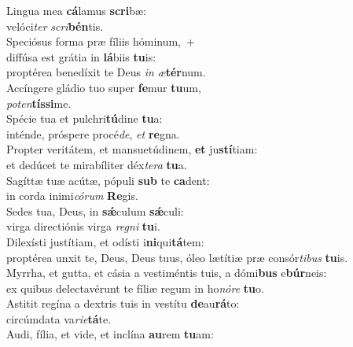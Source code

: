 \evenverse Lingua mea \textbf{cá}lamus \textbf{scri}bæ:~\*\\
\evenverse velóci\textit{ter} \textit{scri}\textbf{bén}tis.\\
\oddverse Speciósus forma præ fíliis hóminum,~+\\
\oddverse  diffúsa est grátia in \textbf{lá}biis \textbf{tu}is:~\*\\
\oddverse proptérea benedíxit te Deus \textit{in} \textit{æ}\textbf{tér}num.\\
\evenverse Accíngere gládio tuo super \textbf{fe}mur \textbf{tu}um,~\*\\
\evenverse \textit{po}\textit{ten}\textbf{tís}\textbf{si}me.\\
\oddverse Spécie tua et pulchri\textbf{tú}dine \textbf{tu}a:~\*\\
\oddverse inténde, próspere procé\textit{de}, \textit{et} \textbf{re}gna.\\
\evenverse Propter veritátem, et mansuetúdinem, \textbf{et} ju\textbf{stí}tiam:~\*\\
\evenverse et dedúcet te mirabíliter déx\textit{te}\textit{ra} \textbf{tu}a.\\
\oddverse Sagíttæ tuæ acútæ, pópuli \textbf{sub} te \textbf{ca}dent:~\*\\
\oddverse in corda inimi\textit{có}\textit{rum} \textbf{Re}gis.\\
\evenverse Sedes tua, Deus, in \textbf{sǽ}culum \textbf{sǽ}culi:~\*\\
\evenverse virga directiónis virga \textit{re}\textit{gni} \textbf{tu}i.\\
\oddverse Dilexísti justítiam, et odísti i\textbf{ni}qui\textbf{tá}tem:~\*\\
\oddverse proptérea unxit te, Deus, Deus tuus, óleo lætítiæ præ consór\textit{ti}\textit{bus} \textbf{tu}is.\\
\evenverse Myrrha, et gutta, et cásia a vestiméntis tuis, a dómi\textbf{bus} e\textbf{búr}neis:~\*\\
\evenverse ex quibus delectavérunt te fíliæ regum in ho\textit{nó}\textit{re} \textbf{tu}o.\\
\oddverse Astitit regína a dextris tuis in vestítu \textbf{de}au\textbf{rá}to:~\*\\
\oddverse circúmdata va\textit{ri}\textit{e}\textbf{tá}te.\\
\evenverse Audi, fília, et vide, et inclína \textbf{au}rem \textbf{tu}am:~\*\\
